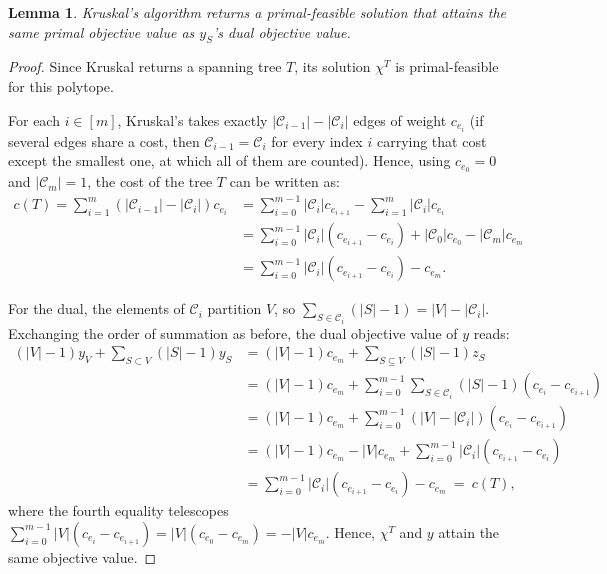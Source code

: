 \documentclass[11pt,letterpaper]{article}
\newtheorem{lemma}[theorem]{Lemma}
\theoremstyle{definition}
\newcommand{\calC}{\mathcal{C}}
\begin{document}
\begin{lemma}
    Kruskal's algorithm returns a primal-feasible solution that attains the same primal objective value as $y_S$'s dual objective value.
\end{lemma}
\begin{proof}
    Since Kruskal returns a spanning tree $T$, its solution $\chi^T$ is primal-feasible for this polytope.

    For each $i\in [m]$, Kruskal's takes exactly $|\calC_{i-1}| - |\calC_{i}|$ edges of weight $c_{e_i}$ (if several edges share a cost, then $\calC_{i-1}=\calC_{i}$ for every index $i$ carrying that cost except the smallest one, at which all of them are counted).
    Hence, using $c_{e_0}=0$ and $|\calC_m|=1$, the cost of the tree $T$ can be written as:
    \begin{align*}
        c(T) = \sum_{i=1}^{m} (|\calC_{i-1}| - |\calC_{i}|) c_{e_i}
        &= \sum_{i=0}^{m-1} |\calC_i| c_{e_{i+1}} - \sum_{i=1}^{m} |\calC_i| c_{e_i} \\
        &= \sum_{i=0}^{m-1} |\calC_i| (c_{e_{i+1}}-c_{e_{i}}) + |\calC_0| c_{e_0} - |\calC_m| c_{e_m} \\
        &= \sum_{i=0}^{m-1} |\calC_i| (c_{e_{i+1}}-c_{e_{i}}) - c_{e_m}.
    \end{align*}

    For the dual, the elements of $\calC_i$ partition $V$, so $\sum_{S\in \calC_i} (|S|-1) = |V|-|\calC_i|$.
    Exchanging the order of summation as before, the dual objective value of $y$ reads:
    \begin{align*}
        (|V|-1) y_V + \sum_{S\subset V} (|S|-1) y_S &= (|V|-1) c_{e_m} + \sum_{S\subseteq V} (|S|-1) z_S \\
        &= (|V|-1) c_{e_m} + \sum_{i=0}^{m-1} \sum_{S\in \calC_i} (|S|-1)  (c_{e_{i}} - c_{e_{i+1}}) \\
        &= (|V|-1) c_{e_m} + \sum_{i=0}^{m-1} \left(|V|-|\calC_i|\right)  (c_{e_{i}} - c_{e_{i+1}}) \\
        &= (|V|-1) c_{e_m} - |V| c_{e_m} + \sum_{i=0}^{m-1} |\calC_i|  (c_{e_{i+1}} - c_{e_{i}}) \\
        &= \sum_{i=0}^{m-1} |\calC_i|  (c_{e_{i+1}} - c_{e_{i}}) - c_{e_m} \ = \ c(T),
    \end{align*}
    where the fourth equality telescopes $\sum_{i=0}^{m-1} |V| (c_{e_{i}} - c_{e_{i+1}}) = |V|(c_{e_0}-c_{e_m}) = -|V|c_{e_m}$.
    Hence, $\chi^T$ and $y$ attain the same objective value.
\end{proof}
\end{document}
